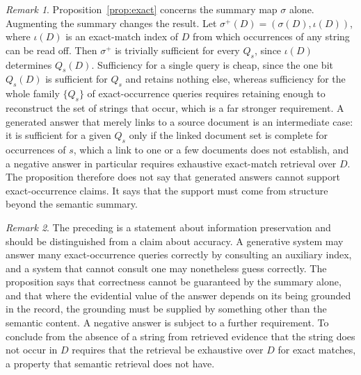 \documentclass[11pt]{article}
\theoremstyle{remark}
\newtheorem{remark}{Remark}
\begin{document}
\begin{remark}
Proposition~\ref{prop:exact} concerns the summary map $\sigma$ alone. Augmenting the summary changes the result. Let $\sigma^{+}(D)=(\sigma(D),\iota(D))$, where $\iota(D)$ is an exact-match index of $D$ from which occurrences of any string can be read off. Then $\sigma^{+}$ is trivially sufficient for every $Q_s$, since $\iota(D)$ determines $Q_s(D)$. Sufficiency for a single query is cheap, since the one bit $Q_s(D)$ is sufficient for $Q_s$ and retains nothing else, whereas sufficiency for the whole family $\{Q_s\}$ of exact-occurrence queries requires retaining enough to reconstruct the set of strings that occur, which is a far stronger requirement. A generated answer that merely links to a source document is an intermediate case: it is sufficient for a given $Q_s$ only if the linked document set is complete for occurrences of $s$, which a link to one or a few documents does not establish, and a negative answer in particular requires exhaustive exact-match retrieval over $D$. The proposition therefore does not say that generated answers cannot support exact-occurrence claims. It says that the support must come from structure beyond the semantic summary.
\end{remark}

\begin{remark}
The preceding is a statement about information preservation and should be distinguished from a claim about accuracy. A generative system may answer many exact-occurrence queries correctly by consulting an auxiliary index, and a system that cannot consult one may nonetheless guess correctly. The proposition says that correctness cannot be guaranteed by the summary alone, and that where the evidential value of the answer depends on its being grounded in the record, the grounding must be supplied by something other than the semantic content. A negative answer is subject to a further requirement. To conclude from the absence of a string from retrieved evidence that the string does not occur in $D$ requires that the retrieval be exhaustive over $D$ for exact matches, a property that semantic retrieval does not have.
\end{remark}
\end{document}
